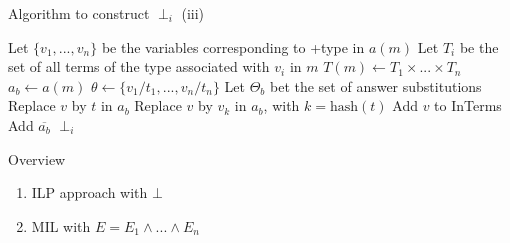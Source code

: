\begin{frame}{Algorithm to construct $\perp_i$ (iii)}

\begin{algorithm}[H]
\scriptsize
\caption{Construct $\perp_i$ - Part 2}
\begin{algorithmic}[1]
\State Let $\{v_1, ..., v_n\}$ be the variables corresponding to +type in $a(m)$
\State Let $T_i$ be the set of all terms of the type associated with $v_i$ in $m$
\State $T(m) \gets T_1 \times ... \times T_n$ 
\State $a_b \gets a(m)$
\State $\theta \gets \{v_1/t_1,...,v_n/t_n\}$
\State Let $\Theta_b$ bet the set of answer substitutions
\State Replace $v$ by $t$ in $a_b$
\Else
\State Replace $v$ by $v_k$ in $a_b$, with $k=\text{hash}(t)$
\EndIf
{}
\State Add $v$ to InTerms
\EndIf
\EndFor
\EndFor
\State Add $\overline{a_b}$
\EndIf
\EndFor
\EndFor
\EndFor
\State \Return $\perp_i$
\end{algorithmic}
\end{algorithm}    
    
\end{frame}

\begin{frame}{Overview}
\begin{enumerate}
\vfill
    \item ILP approach with $\bot$
    \vfill
    \item MIL with $E = E_1 \land ... \land E_n$
\vfill
\end{enumerate}    
\end{frame}
